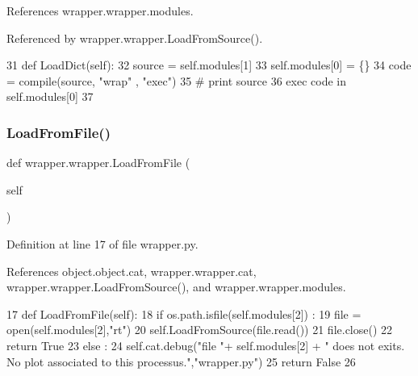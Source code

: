 References wrapper.\+wrapper.\+modules.



Referenced by wrapper.\+wrapper.\+Load\+From\+Source().


\begin{DoxyCode}
31     \textcolor{keyword}{def }LoadDict(self):
32         source = self.modules[1]
33         self.modules[0] = \{\}
34         code = compile(source, \textcolor{stringliteral}{"wrap"} , \textcolor{stringliteral}{"exec"})
35 \textcolor{comment}{#        print source}
36         exec code \textcolor{keywordflow}{in} self.modules[0]
37 
\end{DoxyCode}
\mbox{\label{classwrapper_1_1wrapper_a0ae8c1f5e175d8ea7d43223dc880aba6}} 
\subsubsection{\texorpdfstring{Load\+From\+File()}{LoadFromFile()}}
{\footnotesize\ttfamily def wrapper.\+wrapper.\+Load\+From\+File (\begin{DoxyParamCaption}\item[{}]{self }\end{DoxyParamCaption})}



Definition at line 17 of file wrapper.\+py.



References object.\+object.\+cat, wrapper.\+wrapper.\+cat, wrapper.\+wrapper.\+Load\+From\+Source(), and wrapper.\+wrapper.\+modules.


\begin{DoxyCode}
17     \textcolor{keyword}{def }LoadFromFile(self):
18         \textcolor{keywordflow}{if} os.path.isfile(self.modules[2]) :
19             file = open(self.modules[2],\textcolor{stringliteral}{"rt"})
20             self.LoadFromSource(file.read())
21             file.close()
22             \textcolor{keywordflow}{return} \textcolor{keyword}{True}
23         \textcolor{keywordflow}{else} :
24             self.cat.debug(\textcolor{stringliteral}{"file "}+ self.modules[2] + \textcolor{stringliteral}{" does not exits. No plot associated to this
       processus."},\textcolor{stringliteral}{"wrapper.py"})
25             \textcolor{keywordflow}{return} \textcolor{keyword}{False}
26 
\end{DoxyCode}
\mbox{\label{classwrapper_1_1wrapper_aee2ada5ae65c88654d560ee4c9f23dbb}} 
